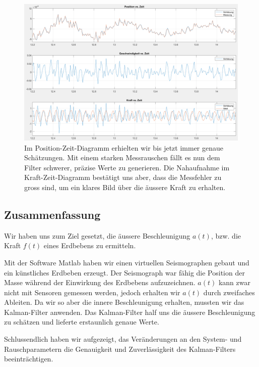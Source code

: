 \begin{figure}
	\begin{center}
		\includegraphics[width=\linewidth,keepaspectratio]{papers/erdbeben/Messrauschen_geaendert_zoom.PNG}
		\caption{Im Position-Zeit-Diagramm erhielten wir bis jetzt immer genaue Schätzungen. Mit einem starken Messrauschen fällt es nun dem Filter schwerer, präzise Werte zu generieren. Die Nahaufnahme im Kraft-Zeit-Diagramm bestätigt uns aber, dass die Messfehler zu gross sind, um ein klares Bild über die äussere Kraft zu erhalten.}
		\label{erdbeben:fig:messrauschen-geaendert_zoom}
	\end{center}
\end{figure}

\subsection{Zusammenfassung}
Wir haben uns zum Ziel gesetzt, die äussere Beschleunigung $a(t)$, bzw. die Kraft $f(t)$ eines Erdbebens zu ermitteln.

Mit der Software Matlab haben wir einen virtuellen Seismographen gebaut und ein künstliches Erdbeben erzeugt.
Der Seismograph war fähig die Position der Masse während der Einwirkung des Erdbebens aufzuzeichnen.
$a(t)$ kann zwar nicht mit Sensoren gemessen werden, jedoch erhalten wir $a(t)$ durch zweifaches Ableiten.
Da wir so aber die innere Beschleunigung erhalten, mussten wir das Kalman-Filter anwenden.
Das Kalman-Filter half uns die äussere Beschleunigung zu schätzen und lieferte erstaunlich genaue Werte.

Schlussendlich haben wir aufgezeigt, das Veränderungen an den System- und Rauschparametern die Genauigkeit und Zuverlässigkeit des Kalman-Filters beeinträchtigen.

